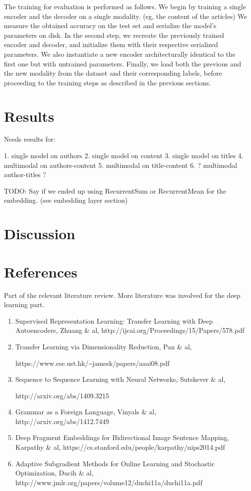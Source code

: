 \documentclass[12pt]{article}
\begin{document}
The training for evaluation is performed as follows. We begin by training a single encoder and the decoder on a single modality.
(eg, the content of the articles) We measure the obtained accuracy on the test set and serialize the model's parameters on disk. In the second step, we recreate the previously trained encoder and decoder, and initialize them with their respective serialized parameters. We also instantiate a new encoder architecturally identical to the first one but with untrained parameters. Finally, we load both the previous and the new modality from the dataset and their corresponding labels, before proceeding to the training steps as described in the previous sections.

\section{Results}\label{results}

Needs results for:

1. single model on authors
2. single model on content
3. single model on titles
4. multimodal on authors-content
5. multimodal on title-content
6. ? multimodal author-titles ?

TODO: Say if we ended up using RecurrentSum or RecurrentMean for the embedding. (see embedding layer section)


\section{Discussion}\label{discussion}

\section{References}\label{References}

Part of the relevant literature review. More literature was involved for
the deep learning part.

\begin{enumerate}
\def\labelenumi{\arabic{enumi}.}
\item
  Supervised Representation Learning: Transfer Learning with Deep
  Autoencoders, Zhuang \& al,
  http://ijcai.org/Proceedings/15/Papers/578.pdf
\item
  Transfer Learning via Dimensionality Reduction, Pan \& al,

  https://www.cse.ust.hk/\textasciitilde{}jamesk/papers/aaai08.pdf
\item
  Sequence to Sequence Learning with Neural Networks, Sutskever \& al,

  http://arxiv.org/abs/1409.3215
\item
  Grammar as a Foreign Language, Vinyals \& al,
  http://arxiv.org/abs/1412.7449
\item
  Deep Fragment Embeddings for Bidirectional Image Sentence Mapping,
  Karpathy \& al, https://cs.stanford.edu/people/karpathy/nips2014.pdf

\item Adaptive Subgradient Methods for Online Learning and Stochastic Optimization, Ducih \& al, http://www.jmlr.org/papers/volume12/duchi11a/duchi11a.pdf
\end{enumerate}

\end{document}
